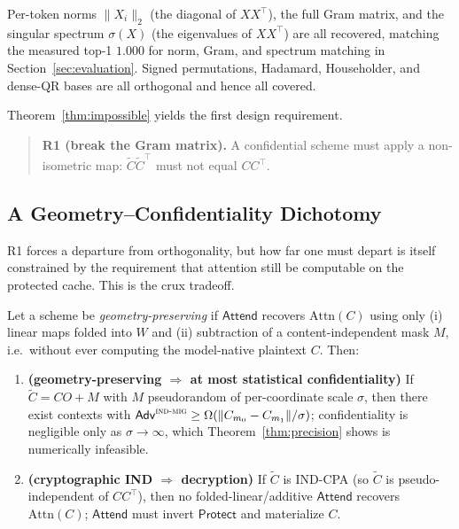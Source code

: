 \begin{corollary}
\label{cor:invariants}
Per-token norms $\lVert X_i\rVert_2$ (the diagonal of $XX^\top$), the full Gram
matrix, and the singular spectrum $\sigma(X)$ (the eigenvalues of $XX^\top$) are
all recovered, matching the measured top-1 $1.000$ for norm, Gram, and spectrum
matching in Section~\ref{sec:evaluation}. Signed permutations, Hadamard,
Householder, and dense-QR bases are all orthogonal and hence all covered.
\end{corollary}

Theorem~\ref{thm:impossible} yields the first design requirement.
\begin{quote}
\textbf{R1 (break the Gram matrix).} A confidential scheme must apply a
non-isometric map: $\tilde C\tilde C^\top$ must not equal $CC^\top$.
\end{quote}

\subsection{A Geometry--Confidentiality Dichotomy}
\label{sec:theory-dichotomy}

R1 forces a departure from orthogonality, but how far one must depart is itself
constrained by the requirement that attention still be computable on the protected
cache. This is the crux tradeoff.

\begin{theorem}
\label{thm:dichotomy}
Let a scheme be \emph{geometry-preserving} if $\mathsf{Attend}$ recovers
$\mathrm{Attn}(C)$ using only (i) linear maps folded into $W$ and (ii) subtraction
of a content-independent mask $M$, i.e.\ without ever computing the model-native
plaintext $C$. Then:
\begin{enumerate}
  \item \textbf{(geometry-preserving $\Rightarrow$ at most statistical confidentiality)}
        If $\tilde C=CO+M$ with $M$ pseudorandom of per-coordinate scale $\sigma$,
        then there exist contexts with
        $\mathsf{Adv}^{\textsc{ind-mig}}\ge \Omega(\lVert C_{m_0}-C_{m_1}\rVert/\sigma)$;
        confidentiality is negligible only as $\sigma\to\infty$, which
        Theorem~\ref{thm:precision} shows is numerically infeasible.
  \item \textbf{(cryptographic IND $\Rightarrow$ decryption)}
        If $\tilde C$ is \textsc{IND-CPA} (so $\tilde C$ is pseudo-independent of
        $CC^\top$), then no folded-linear/additive $\mathsf{Attend}$ recovers
        $\mathrm{Attn}(C)$; $\mathsf{Attend}$ must invert $\mathsf{Protect}$ and
        materialize $C$.
\end{enumerate}
\end{theorem}

